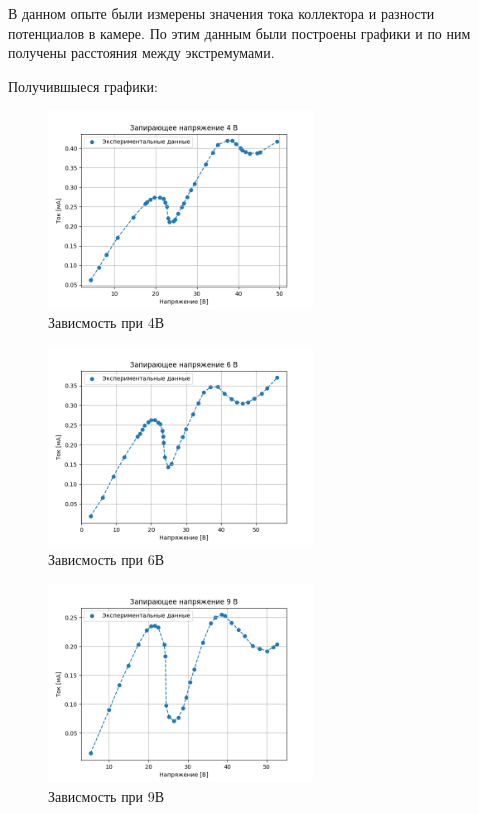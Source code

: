\documentclass[a4paper,12pt]{article} %
\begin{document}
			В данном опыте были измерены значения тока коллектора и разности потенциалов в камере.
			По этим данным были построены графики и по ним получены расстояния между экстремумами.\par
			Получившыеся графики:
			\begin{figure}[h!]
                \centering
                \includegraphics[width=7cm]{img/gra1.png}
                \caption{Зависмость при 4В}
                \label{gra1}
            \end{figure}\par
			\begin{figure}[h!]
                \centering
                \includegraphics[width=7cm]{img/gra2.png}
                \caption{Зависмость при 6В}
                \label{gra1}
            \end{figure}\par
			\begin{figure}[h!]
                \centering
                \includegraphics[width=7cm]{img/gra3.png}
                \caption{Зависмость при 9В}
                \label{gra1}
            \end{figure}\par
\end{document}
